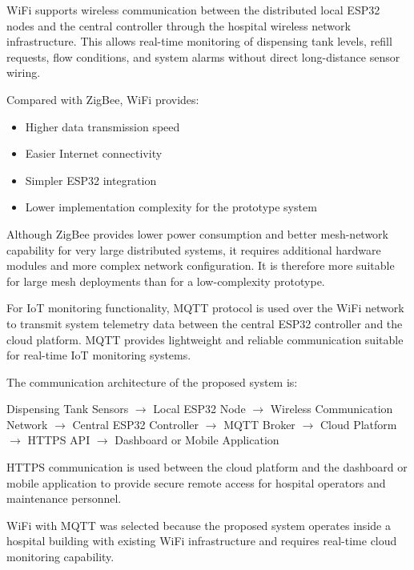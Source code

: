 \documentclass[12pt,a4paper]{report}
\begin{document}
WiFi supports wireless communication between the distributed local ESP32 nodes and the central controller through the hospital wireless network infrastructure. This allows real-time monitoring of dispensing tank levels, refill requests, flow conditions, and system alarms without direct long-distance sensor wiring.

Compared with ZigBee, WiFi provides:

\begin{itemize}
    \item Higher data transmission speed
    \item Easier Internet connectivity
    \item Simpler ESP32 integration
    \item Lower implementation complexity for the prototype system
\end{itemize}

Although ZigBee provides lower power consumption and better mesh-network capability for very large distributed systems, it requires additional hardware modules and more complex network configuration. It is therefore more suitable for large mesh deployments than for a low-complexity prototype.

For IoT monitoring functionality, MQTT protocol is used over the WiFi network to transmit system telemetry data between the central ESP32 controller and the cloud platform. MQTT provides lightweight and reliable communication suitable for real-time IoT monitoring systems.

The communication architecture of the proposed system is:

Dispensing Tank Sensors $\to$ Local ESP32 Node $\to$ Wireless Communication Network $\to$ Central ESP32 Controller $\to$ MQTT Broker $\to$ Cloud Platform $\to$ HTTPS API $\to$ Dashboard or Mobile Application

HTTPS communication is used between the cloud platform and the dashboard or mobile application to provide secure remote access for hospital operators and maintenance personnel.

WiFi with MQTT was selected because the proposed system operates inside a hospital building with existing WiFi infrastructure and requires real-time cloud monitoring capability.
\vspace{6pt}
\end{document}
